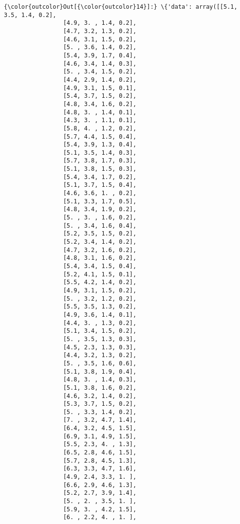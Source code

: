 \documentclass[11pt]{article}
\begin{document}
\begin{Verbatim}[commandchars=\\\{\}]
{\color{outcolor}Out[{\color{outcolor}14}]:} \{'data': array([[5.1, 3.5, 1.4, 0.2],
                 [4.9, 3. , 1.4, 0.2],
                 [4.7, 3.2, 1.3, 0.2],
                 [4.6, 3.1, 1.5, 0.2],
                 [5. , 3.6, 1.4, 0.2],
                 [5.4, 3.9, 1.7, 0.4],
                 [4.6, 3.4, 1.4, 0.3],
                 [5. , 3.4, 1.5, 0.2],
                 [4.4, 2.9, 1.4, 0.2],
                 [4.9, 3.1, 1.5, 0.1],
                 [5.4, 3.7, 1.5, 0.2],
                 [4.8, 3.4, 1.6, 0.2],
                 [4.8, 3. , 1.4, 0.1],
                 [4.3, 3. , 1.1, 0.1],
                 [5.8, 4. , 1.2, 0.2],
                 [5.7, 4.4, 1.5, 0.4],
                 [5.4, 3.9, 1.3, 0.4],
                 [5.1, 3.5, 1.4, 0.3],
                 [5.7, 3.8, 1.7, 0.3],
                 [5.1, 3.8, 1.5, 0.3],
                 [5.4, 3.4, 1.7, 0.2],
                 [5.1, 3.7, 1.5, 0.4],
                 [4.6, 3.6, 1. , 0.2],
                 [5.1, 3.3, 1.7, 0.5],
                 [4.8, 3.4, 1.9, 0.2],
                 [5. , 3. , 1.6, 0.2],
                 [5. , 3.4, 1.6, 0.4],
                 [5.2, 3.5, 1.5, 0.2],
                 [5.2, 3.4, 1.4, 0.2],
                 [4.7, 3.2, 1.6, 0.2],
                 [4.8, 3.1, 1.6, 0.2],
                 [5.4, 3.4, 1.5, 0.4],
                 [5.2, 4.1, 1.5, 0.1],
                 [5.5, 4.2, 1.4, 0.2],
                 [4.9, 3.1, 1.5, 0.2],
                 [5. , 3.2, 1.2, 0.2],
                 [5.5, 3.5, 1.3, 0.2],
                 [4.9, 3.6, 1.4, 0.1],
                 [4.4, 3. , 1.3, 0.2],
                 [5.1, 3.4, 1.5, 0.2],
                 [5. , 3.5, 1.3, 0.3],
                 [4.5, 2.3, 1.3, 0.3],
                 [4.4, 3.2, 1.3, 0.2],
                 [5. , 3.5, 1.6, 0.6],
                 [5.1, 3.8, 1.9, 0.4],
                 [4.8, 3. , 1.4, 0.3],
                 [5.1, 3.8, 1.6, 0.2],
                 [4.6, 3.2, 1.4, 0.2],
                 [5.3, 3.7, 1.5, 0.2],
                 [5. , 3.3, 1.4, 0.2],
                 [7. , 3.2, 4.7, 1.4],
                 [6.4, 3.2, 4.5, 1.5],
                 [6.9, 3.1, 4.9, 1.5],
                 [5.5, 2.3, 4. , 1.3],
                 [6.5, 2.8, 4.6, 1.5],
                 [5.7, 2.8, 4.5, 1.3],
                 [6.3, 3.3, 4.7, 1.6],
                 [4.9, 2.4, 3.3, 1. ],
                 [6.6, 2.9, 4.6, 1.3],
                 [5.2, 2.7, 3.9, 1.4],
                 [5. , 2. , 3.5, 1. ],
                 [5.9, 3. , 4.2, 1.5],
                 [6. , 2.2, 4. , 1. ],

\end{Verbatim}
\end{document}
